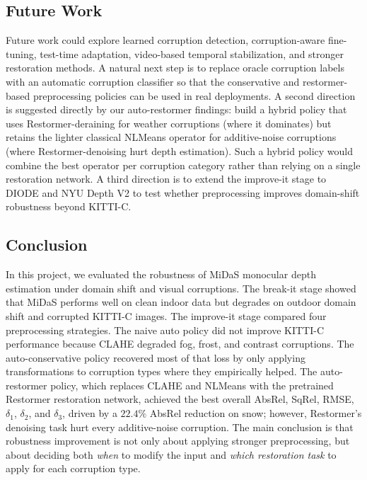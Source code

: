 \documentclass[10pt]{article}
\begin{document}
\subsection{Future Work}

Future work could explore learned corruption detection, corruption-aware fine-tuning, test-time adaptation, video-based temporal stabilization, and stronger restoration methods. A natural next step is to replace oracle corruption labels with an automatic corruption classifier so that the conservative and restormer-based preprocessing policies can be used in real deployments. A second direction is suggested directly by our auto-restormer findings: build a hybrid policy that uses Restormer-deraining for weather corruptions (where it dominates) but retains the lighter classical NLMeans operator for additive-noise corruptions (where Restormer-denoising hurt depth estimation). Such a hybrid policy would combine the best operator per corruption category rather than relying on a single restoration network. A third direction is to extend the improve-it stage to DIODE and NYU Depth V2 to test whether preprocessing improves domain-shift robustness beyond KITTI-C.

\subsection{Conclusion}

In this project, we evaluated the robustness of MiDaS monocular depth estimation under domain shift and visual corruptions. The break-it stage showed that MiDaS performs well on clean indoor data but degrades on outdoor domain shift and corrupted KITTI-C images. The improve-it stage compared four preprocessing strategies. The naive auto policy did not improve KITTI-C performance because CLAHE degraded fog, frost, and contrast corruptions. The auto-conservative policy recovered most of that loss by only applying transformations to corruption types where they empirically helped. The auto-restormer policy, which replaces CLAHE and NLMeans with the pretrained Restormer restoration network, achieved the best overall AbsRel, SqRel, RMSE, $\delta_1$, $\delta_2$, and $\delta_3$, driven by a $22.4\%$ AbsRel reduction on snow; however, Restormer's denoising task hurt every additive-noise corruption. The main conclusion is that robustness improvement is not only about applying stronger preprocessing, but about deciding both \emph{when} to modify the input and \emph{which restoration task} to apply for each corruption type.
\end{document}
